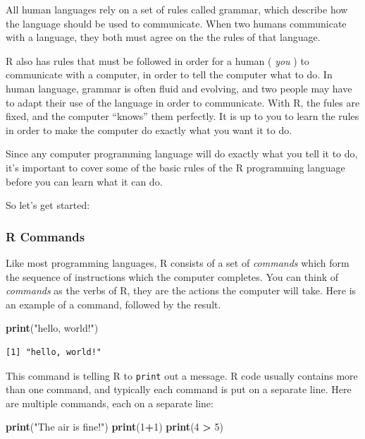 \documentclass[
]{article}
\newenvironment{Shaded}{\begin{snugshade}}{\end{snugshade}}
\newcommand{\DecValTok}[1]{\textcolor[rgb]{0.00,0.00,0.81}{#1}}
\newcommand{\KeywordTok}[1]{\textcolor[rgb]{0.13,0.29,0.53}{\textbf{#1}}}
\newcommand{\NormalTok}[1]{#1}
\newcommand{\OperatorTok}[1]{\textcolor[rgb]{0.81,0.36,0.00}{\textbf{#1}}}
\newcommand{\StringTok}[1]{\textcolor[rgb]{0.31,0.60,0.02}{#1}}
\begin{document}
All human languages rely on a set of rules called grammar, which describe how the language should be used to communicate.
When two humans communicate with a language, they both must agree on the the rules of that language.

R also has rules that must be followed in order for a human ( \emph{you} ) to communicate with a computer, in order to tell the computer what to do.
In human language, grammar is often fluid and evolving, and two people may have to adapt their use of the language in order to communicate.
With R, the fules are fixed, and the computer ``knows'' them perfectly.
It is up to you to learn the rules in order to make the computer do exactly what you want it to do.

Since any computer programming language will do exactly what you tell it to do,
it's important to cover some of the basic rules of the R programming language
before you can learn what it can do.

So let's get started:

\hypertarget{r-commands}{%
\subsubsection{R Commands}\label{r-commands}}

Like most programming languages, R consists of a set of \emph{commands} which form the sequence of instructions which the computer completes. You can think of \emph{commands}
as the verbs of R, they are the actions the computer will take.
Here is an example of a command, followed by the result.

\begin{Shaded}
\begin{Highlighting}[]
\KeywordTok{print}\NormalTok{(}\StringTok{"hello, world!"}\NormalTok{)}
\end{Highlighting}
\end{Shaded}

\begin{verbatim}
[1] "hello, world!"
\end{verbatim}

This command is telling R to \texttt{print} out a message.
R code usually contains more than one command, and typically each command is put on a separate line.
Here are multiple commands, each on a separate line:

\begin{Shaded}
\begin{Highlighting}[]
\KeywordTok{print}\NormalTok{(}\StringTok{"The air is fine!"}\NormalTok{)}
\KeywordTok{print}\NormalTok{(}\DecValTok{1}\OperatorTok{+}\DecValTok{1}\NormalTok{)}
\KeywordTok{print}\NormalTok{(}\DecValTok{4} \OperatorTok{>}\StringTok{ }\DecValTok{5}\NormalTok{)}
\end{Highlighting}
\end{Shaded}
\end{document}
